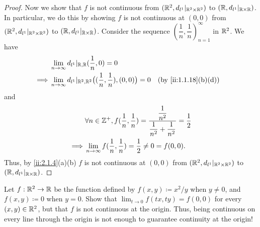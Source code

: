 \begin{proof}
  Now we show that \(f\) is not continuous from \((\mathbb{R}^2, d_{l^1}|_{\mathbb{R}^2 \times \mathbb{R}^2})\) to \((\mathbb{R}, d_{l^1}|_{\mathbb{R} \times \mathbb{R}})\).
  In particular, we do this by showing \(f\) is not continuous at \((0, 0)\) from \((\mathbb{R}^2, d_{l^1}|_{\mathbb{R}^2 \times \mathbb{R}^2})\) to \((\mathbb{R}, d_{l^1}|_{\mathbb{R} \times \mathbb{R}})\).
  Consider the sequence \((\dfrac{1}{n}, \dfrac{1}{n})_{n = 1}^\infty\) in \(\mathbb{R}^2\).
  We have
  \begin{align*}
             & \lim_{n \to \infty} d_{l^1}|_{\R, \R}(\dfrac{1}{n}, 0) = 0                                                           \\
    \implies & \lim_{n \to \infty} d_{l^1}|_{\R^2, \R^2}\big((\dfrac{1}{n}, \dfrac{1}{n}), (0, 0)\big) = 0 &  & \by{ii:1.1.18}[b,d]
  \end{align*}
  and
  \begin{align*}
             & \forall n \in \mathbb{Z}^+, f(\dfrac{1}{n}, \dfrac{1}{n}) = \dfrac{\dfrac{1}{n^2}}{\dfrac{1}{n^2} + \dfrac{1}{n^2}} = \dfrac{1}{2} \\
    \implies & \lim_{n \to \infty} f(\dfrac{1}{n}, \dfrac{1}{n}) = \dfrac{1}{2} \neq 0 = f(0, 0).
  \end{align*}
  Thus, by \cref{ii:2.1.4}(a)(b) \(f\) is not continuous at \((0, 0)\) from \((\mathbb{R}^2, d_{l^1}|_{\mathbb{R}^2 \times \mathbb{R}^2})\) to \((\mathbb{R}, d_{l^1}|_{\mathbb{R} \times \mathbb{R}})\).
\end{proof}

\begin{ex}\label{ii:ex:2.2.12}
  Let \(f: \mathbb{R}^2 \to \mathbb{R}\) be the function defined by \(f(x, y) \coloneqq x^2 / y\) when \(y \neq 0\), and \(f(x, y) \coloneqq 0\) when \(y = 0\).
  Show that \(\lim_{t \to 0} f(tx, ty) = f(0, 0)\) for every \((x, y) \in \mathbb{R}^2\), but that \(f\) is not continuous at the origin.
  Thus, being continuous on every line through the origin is not enough to guarantee continuity at the origin!
\end{ex}


